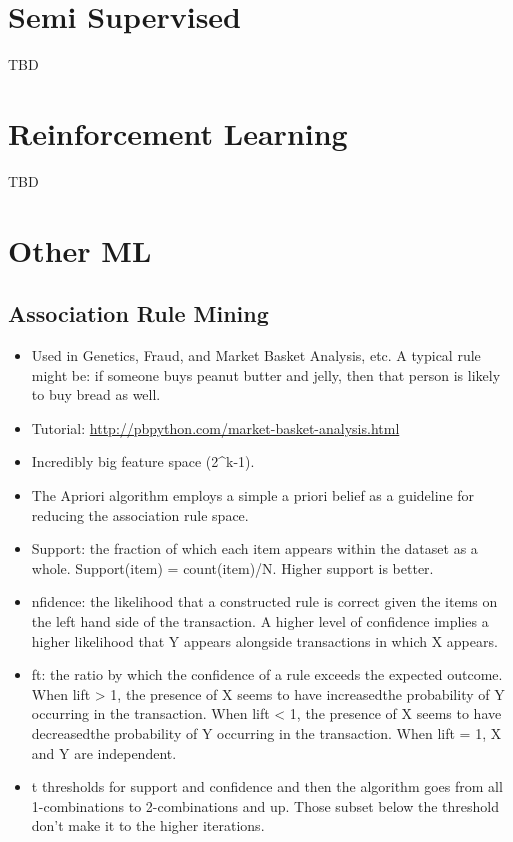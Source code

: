 \documentclass[]{book}
\begin{document}
\hypertarget{semi-supervised}{%
\section{Semi Supervised}\label{semi-supervised}}

TBD

\hypertarget{reinforcement-learning}{%
\section{Reinforcement Learning}\label{reinforcement-learning}}

TBD

\hypertarget{other-ml}{%
\section{Other ML}\label{other-ml}}

\hypertarget{association-rule-mining}{%
\subsection{Association Rule Mining}\label{association-rule-mining}}

\begin{itemize}
\item
  Used in Genetics, Fraud, and Market Basket Analysis, etc. A typical rule might be: if someone buys peanut butter and jelly, then that person is likely to buy bread as well.
\item
  Tutorial: \url{http://pbpython.com/market-basket-analysis.html}
\item
  Incredibly big feature space (2\^{}k-1).
\item
  The Apriori algorithm employs a simple a priori belief as a guideline for reducing the association rule space.
\item
  Support: the fraction of which each item appears within the dataset as a whole. Support(item) = count(item)/N. Higher support is better.
\item
  nfidence: the likelihood that a constructed rule is correct given the items on the left hand side of the transaction. A higher level of confidence implies a higher likelihood that Y appears alongside transactions in which X appears.
\item
  ft: the ratio by which the confidence of a rule exceeds the expected outcome. When lift \textgreater{} 1, the presence of X seems to have increasedthe probability of Y occurring in the transaction. When lift \textless{} 1, the presence of X seems to have decreasedthe probability of Y occurring in the transaction. When lift = 1, X and Y are independent.
\item
  t thresholds for support and confidence and then the algorithm goes from all 1-combinations to 2-combinations and up. Those subset below the threshold don't make it to the higher iterations.
\end{itemize}
\end{document}
